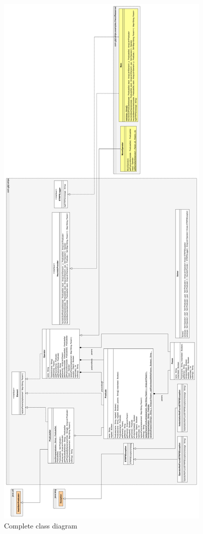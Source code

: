\documentclass[12pt,a4paper,oneside]{article}
\numberwithin{equation}{section}
\numberwithin{equation}{section}
\theoremstyle{definition}
\begin{document}
\begin{itemize}
\begin{figure}[h!]
	\begin{center}
	\includegraphics[scale=0.16]{gbjl-stripshor}
	\end{center}
	\caption{Complete class diagram}
\end{figure}


\end{itemize}
\end{document}
